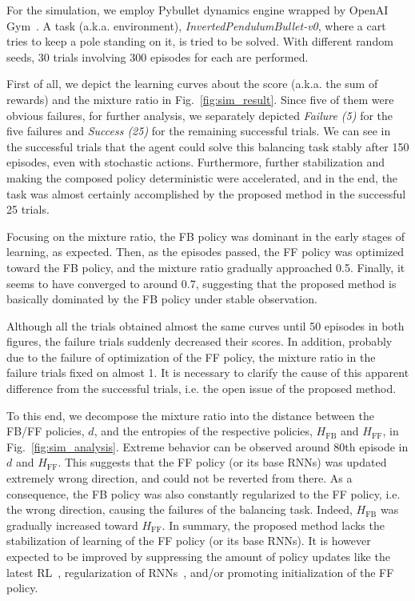 \documentclass{bmcart}
\begin{document}
For the simulation, we employ Pybullet dynamics engine wrapped by OpenAI Gym~\cite{coumans2016pybullet,brockman2016openai}.
A task (a.k.a. environment), \textit{InvertedPendulumBullet-v0}, where a cart tries to keep a pole standing on it, is tried to be solved.
With different random seeds, 30 trials involving 300 episodes for each are performed.

First of all, we depict the learning curves about the score (a.k.a. the sum of rewards) and the mixture ratio in Fig.~\ref{fig:sim_result}.
Since five of them were obvious failures, for further analysis, we separately depicted \textit{Failure (5)} for the five failures and \textit{Success (25)} for the remaining successful trials.
We can see in the successful trials that the agent could solve this balancing task stably after 150 episodes, even with stochastic actions.
Furthermore, further stabilization and making the composed policy deterministic were accelerated, and in the end, the task was almost certainly accomplished by the proposed method in the successful 25 trials.

Focusing on the mixture ratio, the FB policy was dominant in the early stages of learning, as expected.
Then, as the episodes passed, the FF policy was optimized toward the FB policy, and the mixture ratio gradually approached 0.5.
Finally, it seems to have converged to around 0.7, suggesting that the proposed method is basically dominated by the FB policy under stable observation.

Although all the trials obtained almost the same curves until 50 episodes in both figures, the failure trials suddenly decreased their scores.
In addition, probably due to the failure of optimization of the FF policy, the mixture ratio in the failure trials fixed on almost 1.
It is necessary to clarify the cause of this apparent difference from the successful trials, i.e. the open issue of the proposed method.

To this end, we decompose the mixture ratio into the distance between the FB/FF policies, $d$, and the entropies of the respective policies, $H_\mathrm{FB}$ and $H_\mathrm{FF}$, in Fig.~\ref{fig:sim_analysis}.
Extreme behavior can be observed around 80th episode in $d$ and $H_\mathrm{FF}$.
This suggests that the FF policy (or its base RNNs) was updated extremely wrong direction, and could not be reverted from there.
As a consequence, the FB policy was also constantly regularized to the FF policy, i.e. the wrong direction, causing the failures of the balancing task.
Indeed, $H_\mathrm{FB}$ was gradually increased toward $H_\mathrm{FF}$.
In summary, the proposed method lacks the stabilization of learning of the FF policy (or its base RNNs).
It is however expected to be improved by suppressing the amount of policy updates like the latest RL~\cite{kobayashi2020proximal}, regularization of RNNs~\cite{zaremba2014recurrent}, and/or promoting initialization of the FF policy.
\end{document}
